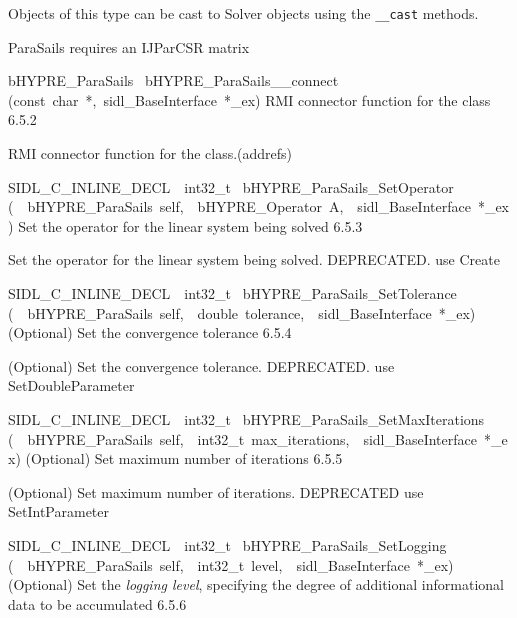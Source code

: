 \documentclass{article}
\begin{document}
\begin{cxxentry}
\begin{cxxentry}
\begin{cxxvariable}
\begin{cxxdoc}
Objects of this type can be cast to Solver objects using the
{\tt \_\_cast} methods.

ParaSails requires an IJParCSR matrix
\end{cxxdoc}
\end{cxxvariable}
\begin{cxxfunction}
{bHYPRE\_ParaSails\ }
        {bHYPRE\_ParaSails\_\_connect}
        {(const\ char\ *,\ sidl\_BaseInterface\ *\_ex)}
        {
RMI connector function for the class}
        {6.5.2}
\begin{cxxdoc}

RMI connector function for the class.(addrefs)
\end{cxxdoc}
\end{cxxfunction}
\begin{cxxfunction}
{SIDL\_C\_INLINE\_DECL\ \ int32\_t\ }
        {bHYPRE\_ParaSails\_SetOperator}
        {(\ \ bHYPRE\_ParaSails\ self,\ \ bHYPRE\_Operator\ A,\ \ sidl\_BaseInterface\ *\_ex)}
        {
Set the operator for the linear system being solved}
        {6.5.3}
\begin{cxxdoc}

Set the operator for the linear system being solved.
DEPRECATED.  use Create
\end{cxxdoc}
\end{cxxfunction}
\begin{cxxfunction}
{SIDL\_C\_INLINE\_DECL\ \ int32\_t\ }
        {bHYPRE\_ParaSails\_SetTolerance}
        {(\ \ bHYPRE\_ParaSails\ self,\ \ double\ tolerance,\ \ sidl\_BaseInterface\ *\_ex)}
        {
(Optional) Set the convergence tolerance}
        {6.5.4}
\begin{cxxdoc}

(Optional) Set the convergence tolerance.
DEPRECATED.  use SetDoubleParameter
\end{cxxdoc}
\end{cxxfunction}
\begin{cxxfunction}
{SIDL\_C\_INLINE\_DECL\ \ int32\_t\ }
        {bHYPRE\_ParaSails\_SetMaxIterations}
        {(\ \ bHYPRE\_ParaSails\ self,\ \ int32\_t\ max\_iterations,\ \ sidl\_BaseInterface\ *\_ex)}
        {
(Optional) Set maximum number of iterations}
        {6.5.5}
\begin{cxxdoc}

(Optional) Set maximum number of iterations.
DEPRECATED   use SetIntParameter
\end{cxxdoc}
\end{cxxfunction}
\begin{cxxfunction}
{SIDL\_C\_INLINE\_DECL\ \ int32\_t\ }
        {bHYPRE\_ParaSails\_SetLogging}
        {(\ \ bHYPRE\_ParaSails\ self,\ \ int32\_t\ level,\ \ sidl\_BaseInterface\ *\_ex)}
        {
(Optional) Set the {\it logging level}, specifying the degree
of additional informational data to be accumulated}
        {6.5.6}
\begin{cxxdoc}


\end{cxxdoc}
\end{cxxfunction}
\end{cxxentry}
\end{cxxentry}
\end{document}

